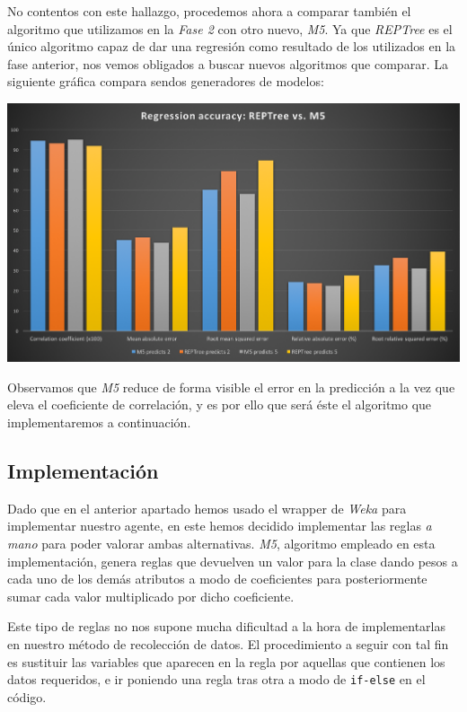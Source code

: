\documentclass[12pt]{article}
\begin{document}
\vspace{0.3cm}

No contentos con este hallazgo, procedemos ahora a comparar también el algoritmo que utilizamos en la \emph{Fase 2} con otro nuevo, \emph{M5}. Ya que \emph{REPTree} es el único algoritmo capaz de dar una regresión como resultado de los utilizados en la fase anterior, nos vemos obligados a buscar nuevos algoritmos que comparar. La siguiente gráfica compara sendos generadores de modelos:

\vspace{0.3cm}

\noindent \includegraphics[width=\textwidth]{REPTree_vs_M5}

\vspace{0.3cm}

Observamos que \emph{M5} reduce de forma visible el error en la predicción a la vez que eleva el coeficiente de correlación, y es por ello que será éste el algoritmo que implementaremos a continuación.

\subsection{Implementación}

Dado que en el anterior apartado hemos usado el wrapper de \emph{Weka} para implementar nuestro agente, en este hemos decidido implementar las reglas \emph{a mano} para poder valorar ambas alternativas. \emph{M5}, algoritmo empleado en esta implementación, genera reglas que devuelven un valor para la clase dando pesos a cada uno de los demás atributos a modo de coeficientes para posteriormente sumar cada valor multiplicado por dicho coeficiente.

Este tipo de reglas no nos supone mucha dificultad a la hora de implementarlas en nuestro método de recolección de datos. El procedimiento a seguir con tal fin es sustituir las variables que aparecen en la regla por aquellas que contienen los datos requeridos, e ir poniendo una regla tras otra a modo de \texttt{if-else} en el código.
\end{document}
